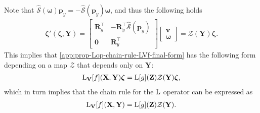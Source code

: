 Note that $\widehat{\mathcal{S}}(\boldsymbol{\omega})\mathbf{p}_y = -\widehat{\mathcal{S}}(\mathbf{p}_y)\boldsymbol{\omega}$, and thus the following holds
\begin{align}
    \boldsymbol{\zeta}'(\boldsymbol{\zeta}, \mathbf{Y}) = \begin{bmatrix}
        \mathbf{R}_y^\top & -\mathbf{R}_y^\top\widehat{\mathcal{S}}(\mathbf{p}_y)\\
        \mathbf{0} & \mathbf{R}_y^\top
    \end{bmatrix}\begin{bmatrix}
        \mathbf{v}\\\boldsymbol{\omega}
    \end{bmatrix}
    = \mathcal{Z}(\mathbf{Y})\boldsymbol{\zeta}.
\end{align}
This implies that \eqref{app:prop-Lop-chain-rule-LVf-final-form} has the following form depending on a map $\mathcal{Z}$ that depends only on $\mathbf{Y}$:
\begin{align}
    \operatorname{L}_\mathbf{V}[f](\mathbf{X}, \mathbf{Y})\boldsymbol{\zeta} = \operatorname{L}[g](\mathbf{Z})\mathcal{Z}(\mathbf{Y})\boldsymbol{\zeta},
\end{align}
which in turn implies that the chain rule for the $\operatorname{L}$ operator can be expressed as
\begin{align}
    \operatorname{L}_\mathbf{V}[f](\mathbf{X}, \mathbf{Y}) = \operatorname{L}[g](\mathbf{Z})\mathcal{Z}(\mathbf{Y}). \label{eq:appendix-prop-Lop-chain-rule-SE3}
\end{align}